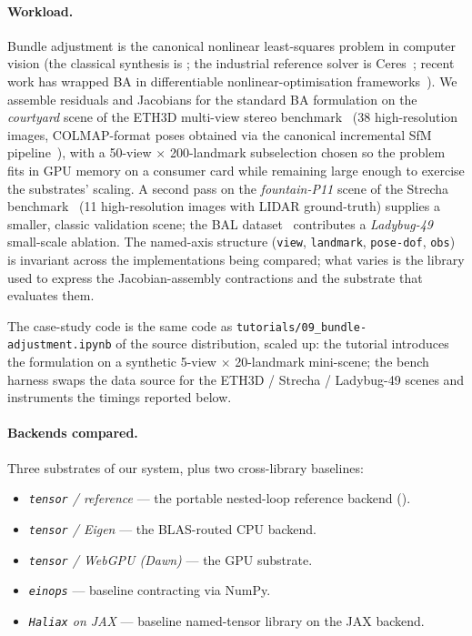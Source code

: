 \documentclass[10pt,twocolumn]{article}
\newcommand{\code}[1]{\texttt{#1}}
\begin{document}
\paragraph{Workload.}
Bundle adjustment is the canonical nonlinear least-squares problem
in computer vision (the classical synthesis is
\cite{triggs2000bundle}; the industrial reference solver is
Ceres~\cite{agarwal2010ceres}; recent work has wrapped BA in
differentiable nonlinear-optimisation
frameworks~\cite{pineda2022theseus,hu2020difftaichi}). We assemble
residuals and Jacobians for the standard BA formulation on the
\emph{courtyard} scene of the ETH3D multi-view stereo
benchmark~\cite{schoeps2017eth3d} (38 high-resolution images,
COLMAP-format poses obtained via the canonical incremental SfM
pipeline~\cite{schoenberger2016sfm}), with a 50-view
$\times$ 200-landmark subselection chosen so the problem fits in
GPU memory on a consumer card while remaining large enough to
exercise the substrates' scaling. A second pass on the
\emph{fountain-P11} scene of the Strecha
benchmark~\cite{strecha2008benchmarking} (11 high-resolution images
with LIDAR ground-truth) supplies a smaller, classic validation
scene; the BAL dataset~\cite{agarwal2010bal} contributes a
\emph{Ladybug-49} small-scale ablation. The named-axis structure
(\code{view}, \code{landmark}, \code{pose-dof}, \code{obs}) is
invariant across the implementations being compared; what varies is
the library used to express the Jacobian-assembly contractions and
the substrate that evaluates them.

The case-study code is the same code as
\code{tutorials/09\_bundle-adjustment.ipynb} of the source
distribution, scaled up: the tutorial introduces the formulation on a
synthetic 5-view $\times$ 20-landmark mini-scene; the bench harness
swaps the data source for the ETH3D / Strecha / Ladybug-49 scenes
and instruments the timings reported below.

\paragraph{Backends compared.} Three substrates of our system, plus
two cross-library baselines:

\begin{itemize}
  \item \emph{\code{tensor} / reference} --- the portable nested-loop
        reference backend ().
  \item \emph{\code{tensor} / Eigen} --- the BLAS-routed CPU backend.
  \item \emph{\code{tensor} / WebGPU (Dawn)} --- the GPU substrate.
  \item \emph{\code{einops}} --- baseline contracting via NumPy.
  \item \emph{\code{Haliax} on JAX} --- baseline named-tensor library on
        the JAX backend.
\end{itemize}
\end{document}
